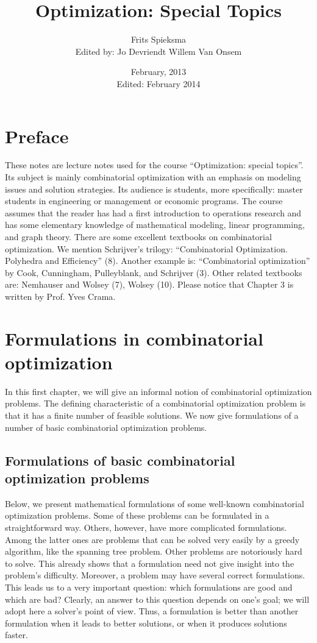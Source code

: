 \documentclass[titlepage]{book}
\title{Optimization: Special Topics}
\author{Frits Spieksma\\Edited by: Jo Devriendt Willem Van Onsem}
\date{February, 2013\\Edited: February 2014}
\begin{document}
\begin{titlepage}
\maketitle
\end{titlepage}
\tableofcontents
\chapter*{Preface}
These notes are lecture notes used for the course ``Optimization: special topics''. Its subject is mainly
combinatorial optimization with an emphasis on modeling issues and solution strategies. Its audience is
students, more specifically: master students in engineering or management or economic programs.
The course assumes that the reader has had a first introduction to operations research and has some
elementary knowledge of mathematical modeling, linear programming, and graph theory.
There are some excellent textbooks on combinatorial optimization. We mention Schrijver's trilogy: ``Combinatorial Optimization. Polyhedra and Efficiency'' (8). Another example is: ``Combinatorial optimization'' by Cook, Cunningham, Pulleyblank, and Schrijver (3). Other related textbooks are: Nemhauser
and Wolsey (7), Wolsey (10).
Please notice that Chapter 3 is written by Prof. Yves Crama.

\chapter{Formulations in combinatorial optimization}
In this first chapter, we will give an informal notion of combinatorial optimization problems. The defining
characteristic of a combinatorial optimization problem is that it has a finite number of feasible solutions.
We now give formulations of a number of basic combinatorial optimization problems.

\section{Formulations of basic combinatorial optimization problems}

Below, we present mathematical formulations of some well-known combinatorial optimization problems.
Some of these problems can be formulated in a straightforward way. Others, however, have more complicated formulations. Among the latter ones are problems that can be solved very easily by a greedy
algorithm, like the spanning tree problem. Other problems are notoriously hard to solve. This already
shows that a formulation need not give insight into the problem's difficulty. Moreover, a problem may
have several correct formulations. This leads us to a very important question: which formulations are
good and which are bad? Clearly, an answer to this question depends on one's goal; we will adopt here
a solver's point of view. Thus, a formulation is better than another formulation when it leads to better
solutions, or when it produces solutions faster.
\end{document}
